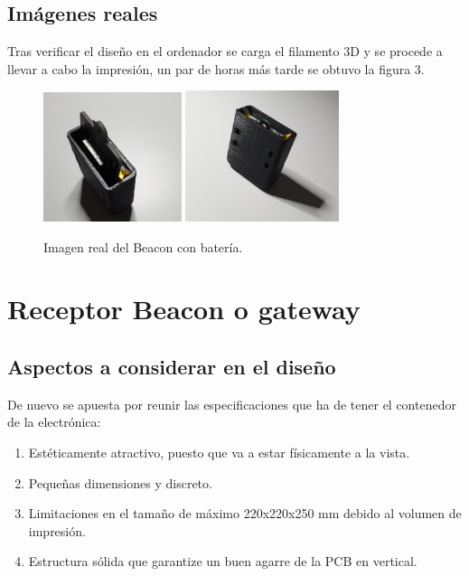 \documentclass[paper=a4, fontsize=11pt,twoside]{scrartcl}
\begin{document}
    \subsection{Imágenes reales}
        Tras verificar el diseño en el ordenador se carga el filamento 3D y se procede a llevar a cabo la impresión, un par de horas más tarde
        se obtuvo la figura 3.
        \begin{center}
            \begin{figure}[H]
                \centering
                \includegraphics[width=0.36\textwidth]{../3d_beacon_1.jpeg}
                \includegraphics[width=0.4\textwidth]{../3d_beacon_2.jpeg}
                \caption{Imagen real del Beacon con batería.}
                \label{fig:mesh1}
            \end{figure}
        \end{center}

\section{Receptor Beacon o gateway}
    \subsection{Aspectos a considerar en el diseño}
        De nuevo se apuesta por reunir las especificaciones que ha de tener el contenedor de la electrónica:
        \begin{enumerate}
            \item Estéticamente atractivo, puesto que va a estar físicamente a la vista.
            \item Pequeñas dimensiones y discreto.
            \item Limitaciones en el tamaño de máximo 220x220x250 mm debido al volumen de impresión.
            \item Estructura sólida que garantize un buen agarre de la PCB en vertical.
        \end{enumerate}
\end{document}
